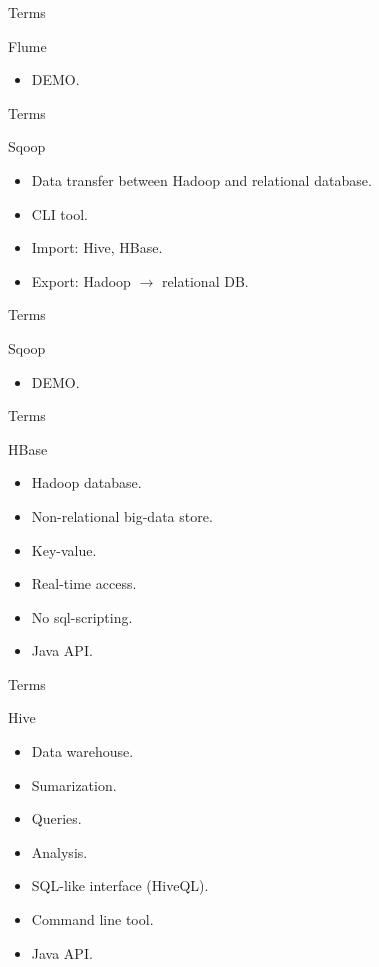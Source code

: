 \begin{frame}{Terms}
  \begin{block}{Flume}
    \begin{itemize}
      \item DEMO. 
    \end{itemize}
  \end{block}
\end{frame}

\begin{frame}{Terms}
  \begin{block}{Sqoop}
    \begin{itemize}
      \item Data transfer between Hadoop and relational database.
      \item CLI tool.
      \item Import: Hive, HBase.
      \item Export: Hadoop $\rightarrow$ relational DB.
    \end{itemize}
  \end{block}
\end{frame}

\begin{frame}{Terms}
  \begin{block}{Sqoop}
    \begin{itemize}
      \item DEMO.
    \end{itemize}
  \end{block}
\end{frame}

\begin{frame}{Terms}
  \begin{block}{HBase}
    \begin{itemize}
      \item Hadoop database.
      \item Non-relational big-data store.
      \item Key-value.
      \item Real-time access.
      \item No sql-scripting.
      \item Java API.
    \end{itemize}
  \end{block}
\end{frame}

\begin{frame}{Terms}
  \begin{block}{Hive}
    \begin{itemize}
      \item Data warehouse.
      \item Sumarization.
      \item Queries.
      \item Analysis.
      \item SQL-like interface (HiveQL).
      \item Command line tool.
      \item Java API.
    \end{itemize}
  \end{block}
\end{frame}

